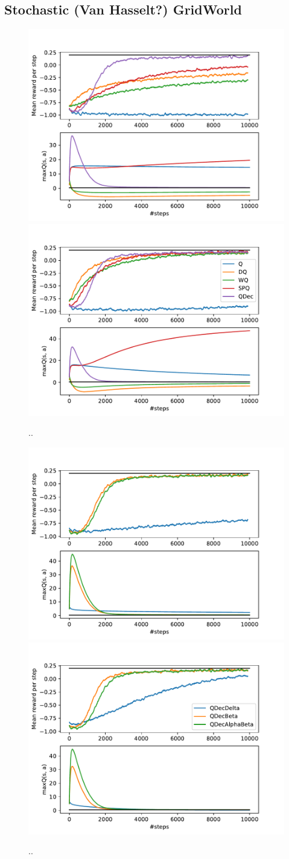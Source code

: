 \documentclass[conference]{IEEEtran}
\begin{document}
\subsection{Stochastic (Van Hasselt?) GridWorld}
 \begin{figure}[t]
  \begin{minipage}{\textwidth}
  \centering
   \includegraphics[width=.475\textwidth]{./imgs/gridHasselt/allAlgs1.pdf}
   \includegraphics[width=.475\textwidth]{./imgs/gridHasselt/allAlgs08.pdf}\\
  \end{minipage}
   \caption{..}
   \label{F:hasselt_all}
 \end{figure}
 \begin{figure}[t]
  \begin{minipage}{\textwidth}
  \centering
   \includegraphics[width=.475\textwidth]{./imgs/gridHasselt/QDecs1.pdf}
   \includegraphics[width=.475\textwidth]{./imgs/gridHasselt/QDecs08.pdf}\\
  \end{minipage}
   \caption{..}
   \label{F:hasselt_all}
 \end{figure}
\end{document}
